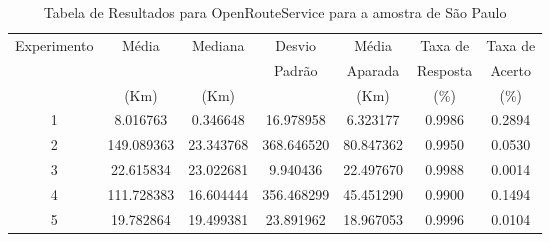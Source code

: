\begin{anexosenv}
\begin{table}[ht]
\centering
\begin{tabular}{|c|c|c|c|c|c|c|}
\hline
Experimento & Média & Mediana & Desvio & Média & Taxa de & Taxa de \\
    & & & Padrão & Aparada & Resposta & Acerto \\
    & (Km) & (Km) & & (Km) & (\%) & (\%) \\ \hline
1 & 8.016763 & 0.346648 & 16.978958 & 6.323177 & 0.9986 & 0.2894 \\ \hline
2 & 149.089363 & 23.343768 & 368.646520 & 80.847362 & 0.9950 & 0.0530 \\ \hline
3 & 22.615834 & 23.022681 & 9.940436 & 22.497670 & 0.9988 & 0.0014 \\ \hline
4 & 111.728383 & 16.604444 & 356.468299 & 45.451290 & 0.9900 & 0.1494 \\ \hline
5 & 19.782864 & 19.499381 & 23.891962 & 18.967053 & 0.9996 & 0.0104 \\ \hline
\end{tabular}
\caption{Tabela de Resultados para OpenRouteService para a amostra de São Paulo}
\label{tab:openrouteserviceSP}
\end{table}
    


\end{anexosenv}
